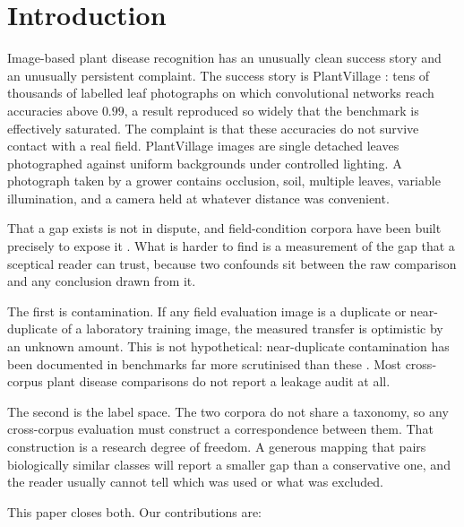 \documentclass[runningheads]{llncs}
\begin{document}
\section{Introduction}

Image-based plant disease recognition has an unusually clean success story and
an unusually persistent complaint. The success story is PlantVillage
\cite{mohanty2016plantvillage}: tens of thousands of labelled leaf photographs
on which convolutional networks reach accuracies above $0.99$, a result
reproduced so widely that the benchmark is effectively saturated. The complaint
is that these accuracies do not survive contact with a real field. PlantVillage
images are single detached leaves photographed against uniform backgrounds under
controlled lighting. A photograph taken by a grower contains occlusion, soil,
multiple leaves, variable illumination, and a camera held at whatever distance
was convenient.

That a gap exists is not in dispute, and field-condition corpora have been built
precisely to expose it \cite{singh2020plantdoc,moupojou2023fieldplant,wei2024plantwild}.
What is harder to find is a measurement of the gap that a sceptical reader can
trust, because two confounds sit between the raw comparison and any conclusion
drawn from it.

The first is contamination. If any field evaluation image is a duplicate or
near-duplicate of a laboratory training image, the measured transfer is
optimistic by an unknown amount. This is not hypothetical: near-duplicate
contamination has been documented in benchmarks far more scrutinised than these
\cite{barz2020purging}. Most cross-corpus plant disease comparisons do not
report a leakage audit at all.

The second is the label space. The two corpora do not share a taxonomy, so any
cross-corpus evaluation must construct a correspondence between them. That
construction is a research degree of freedom. A generous mapping that pairs
biologically similar classes will report a smaller gap than a conservative one,
and the reader usually cannot tell which was used or what was excluded.

This paper closes both. Our contributions are:
\end{document}
